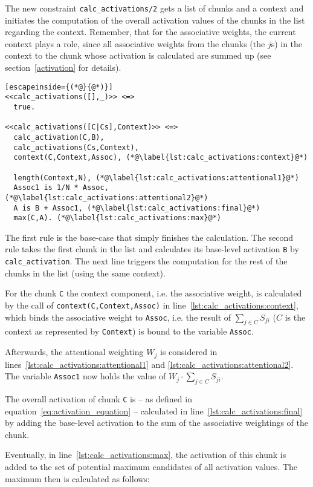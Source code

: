 The new constraint \lstinline|calc_activations/2| gets a list of chunks and a context and initiates the computation of the overall activation values of the chunks in the list regarding the context. Remember, that for the associative weights, the current context plays a role, since all associative weights from the chunks (the $j$s) in the context to the chunk whose activation is calculated are summed up (see section~\ref{activation} for details).

\begin{lstlisting}[escapeinside={(*@}{@*)}]
<<calc_activations([],_)>> <=>
  true.
  
<<calc_activations([C|Cs],Context)>> <=> 
  calc_activation(C,B), 
  calc_activations(Cs,Context), 
  context(C,Context,Assoc), (*@\label{lst:calc_activations:context}@*)
  
  length(Context,N), (*@\label{lst:calc_activations:attentional1}@*)
  Assoc1 is 1/N * Assoc, (*@\label{lst:calc_activations:attentional2}@*)
  A is B + Assoc1, (*@\label{lst:calc_activations:final}@*)
  max(C,A). (*@\label{lst:calc_activations:max}@*)
\end{lstlisting}

The first rule is the base-case that simply finishes the calculation. The second rule takes the first chunk in the list and calculates its base-level activation \lstinline|B| by \lstinline|calc_activation|. The next line triggers the computation for the rest of the chunks in the list (using the same context).

For the chunk \lstinline|C| the context component, i.e. the associative weight, is calculated by the call of \lstinline|context(C,Context,Assoc)| in line~\ref{lst:calc_activations:context}, which binds the associative weight to \lstinline|Assoc|, i.e. the result of $\sum_{j \in C}{S_{ji}}$ ($C$ is the context as represented by \lstinline|Context|) is bound to the variable \lstinline|Assoc|.

Afterwards, the attentional weighting $W_j$ is considered in lines~\ref{lst:calc_activations:attentional1} and \ref{lst:calc_activations:attentional2}. The variable \lstinline|Assoc1| now holds the value of $W_j \cdot \sum_{j \in C}{S_{ji}}$.

The overall activation of chunk \lstinline|C| is -- as defined in equation~\eqref{eq:activation_equation} -- calculated in line~\ref{lst:calc_activations:final} by adding the base-level activation to the sum of the associative weightings of the chunk.

Eventually, in line~\ref{lst:calc_activations:max}, the activation of this chunk is added to the set of potential maximum candidates of all activation values. The maximum then is calculated as follows:

